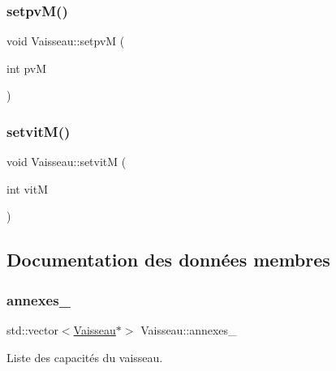 \mbox{\label{class_vaisseau_a10a33c8fed1bb1530148e98313d80a87}} 
\subsubsection{\texorpdfstring{setpv\+M()}{setpvM()}}
{\footnotesize\ttfamily void Vaisseau\+::setpvM (\begin{DoxyParamCaption}\item[{int}]{pvM }\end{DoxyParamCaption})}

\mbox{\label{class_vaisseau_a5816b1761b1d6f12f2ee3077b938392a}} 
\subsubsection{\texorpdfstring{setvit\+M()}{setvitM()}}
{\footnotesize\ttfamily void Vaisseau\+::setvitM (\begin{DoxyParamCaption}\item[{int}]{vitM }\end{DoxyParamCaption})}



\subsection{Documentation des données membres}
\mbox{\label{class_vaisseau_a077c826bea6ce9f63de811762fbe8784}} 
\subsubsection{\texorpdfstring{annexes\+\_\+}{annexes\_}}
{\footnotesize\ttfamily std\+::vector$<$\hyperlink{class_vaisseau}{Vaisseau}$\ast$$>$ Vaisseau\+::annexes\+\_\+\hspace{0.3cm}{\ttfamily [protected]}}



Liste des capacités du vaisseau. 

\mbox{\label{class_vaisseau_a584960419ccc6ae137c196a012d7eb9f}} 
